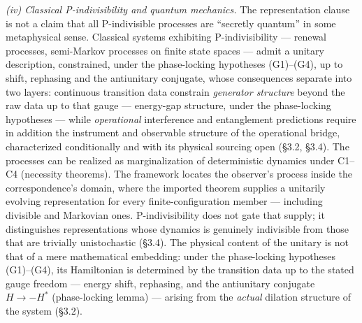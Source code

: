 \documentclass[
]{article}
\begin{document}
\emph{(iv) Classical P-indivisibility and quantum mechanics.} The
representation clause is not a claim that all P-indivisible processes
are ``secretly quantum'' in some metaphysical sense. Classical systems
exhibiting P-indivisibility --- renewal processes, semi-Markov processes
on finite state spaces --- admit a unitary description, constrained,
under the phase-locking hypotheses (G1)--(G4), up to shift, rephasing
and the antiunitary conjugate, whose consequences separate into two
layers: continuous transition data constrain \emph{generator structure}
beyond the raw data up to that gauge --- energy-gap structure, under the
phase-locking hypotheses --- while \emph{operational} interference and
entanglement predictions require in addition the instrument and
observable structure of the operational bridge, characterized
conditionally and with its physical sourcing open (§3.2, §3.4). The
processes can be realized as marginalization of deterministic dynamics
under C1--C4 (necessity theorems). The framework locates the observer's
process inside the correspondence's domain, where the imported theorem
supplies a unitarily evolving representation for every
finite-configuration member --- including divisible and Markovian ones.
P-indivisibility does not gate that supply; it distinguishes
representations whose dynamics is genuinely indivisible from those that
are trivially unistochastic (§3.4). The physical content of the unitary
is not that of a mere mathematical embedding: under the phase-locking
hypotheses (G1)--(G4), its Hamiltonian is determined by the transition
data up to the stated gauge freedom --- energy shift, rephasing, and the
antiunitary conjugate \(H \to -H^*\) (phase-locking lemma) --- arising
from the \emph{actual} dilation structure of the system (§3.2).
\end{document}
